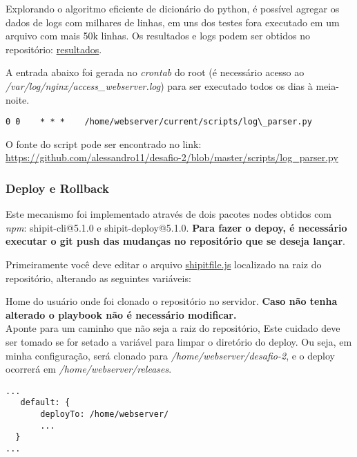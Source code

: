 Explorando o algoritmo eficiente de dicionário do python, é possível
agregar os dados de logs com milhares de linhas, em uns dos testes
fora executado em um arquivo com mais 50k linhas. Os resultados e logs
podem ser obtidos no repositório:
\href{https://github.com/alessandro11/linx-challenge/tree/master/results}{resultados}.

A entrada abaixo foi gerada no \emph{crontab} do root (é necessário
acesso ao \textit{/var/log/nginx/access\_webserver.log}) para ser
executado todos os dias à meia-noite.

\begin{verbatim}
0 0    * * *    /home/webserver/current/scripts/log\_parser.py
\end{verbatim}

O fonte do script pode ser encontrado no link:\\
\href{https://github.com/alessandro11/desafio-2/blob/master/scripts/log\_parser.py}{https://github.com/alessandro11/desafio-2/blob/master/scripts/log\_parser.py} \label{lnk:logparser}


\subsubsection{Deploy e Rollback}
Este mecanismo foi implementado através de dois pacotes nodes obtidos com
\emph{npm}: shipit-cli@5.1.0 e shipit-deploy@5.1.0. \textbf{Para fazer o depoy,
é necessário executar o git push das mudanças no repositório que se deseja lançar}.

Primeiramente você deve editar o arquivo
\href{https://github.com/alessandro11/desafio-2/blob/master/shipitfile.js}{shipitfile.js}
localizado na raiz do repositório, alterando as seguintes variáveis:

Home do usuário onde foi clonado o repositório no servidor. \textbf{Caso não
tenha alterado o playbook não é necessário modificar.}\\

\color{red}
Aponte para um caminho que não seja a raiz do repositório,
Este cuidado deve ser tomado se for setado a variável para limpar o
diretório do deploy. Ou seja, em minha configuração, será clonado
para \textit{/home/webserver/desafio-2}, e o deploy ocorrerá em
\textit{/home/webserver/releases}.

\color{black}
\begin{verbatim}
...
   default: {
       deployTo: /home/webserver/
       ...
  }
...
\end{verbatim}

